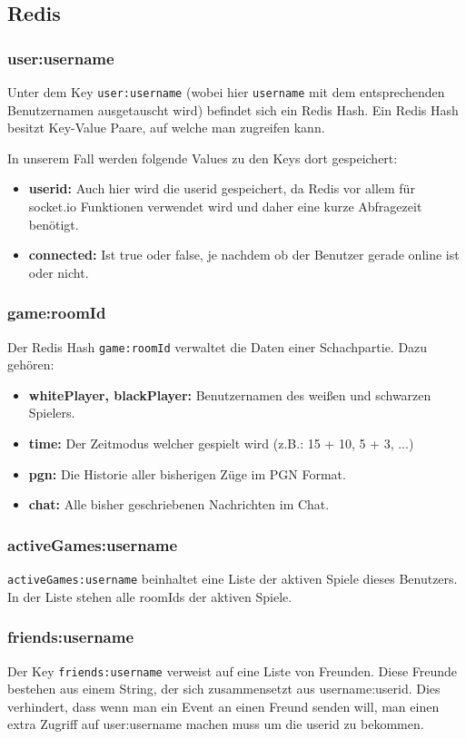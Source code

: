\subsection{Redis}
\label{sec:redis-data}
\subsubsection{user:username}
Unter dem Key \verb|user:username| (wobei hier \verb|username| mit dem entsprechenden Benutzernamen ausgetauscht wird) befindet sich ein Redis Hash. Ein Redis Hash besitzt Key-Value Paare, auf welche man zugreifen kann.

In unserem Fall werden folgende Values zu den Keys dort gespeichert:
\begin{itemize}
\item \textbf{userid:} Auch hier wird die userid gespeichert, da Redis vor allem für socket.io Funktionen verwendet wird und daher eine kurze Abfragezeit benötigt.
\item \textbf{connected:} Ist \glqq true\grqq{ } oder \glqq false\grqq , je nachdem ob der Benutzer gerade online ist oder nicht.
\end{itemize}

\subsubsection{game:roomId}
Der Redis Hash \verb|game:roomId| verwaltet die Daten einer Schachpartie. Dazu gehören:
\begin{itemize}
\item \textbf{whitePlayer, blackPlayer:} Benutzernamen des weißen und schwarzen Spielers.
\item \textbf{time:} Der Zeitmodus welcher gespielt wird (z.B.: 15 + 10, 5 + 3, ...)
\item \textbf{pgn:} Die Historie aller bisherigen Züge im PGN Format.
\item \textbf{chat:} Alle bisher geschriebenen Nachrichten im Chat.
\end{itemize}

\subsubsection{activeGames:username}
\verb|activeGames:username| beinhaltet eine Liste der aktiven Spiele dieses Benutzers. In der Liste stehen alle roomIds der aktiven Spiele.

\subsubsection{friends:username}
Der Key \verb|friends:username| verweist auf eine Liste von Freunden. Diese Freunde bestehen aus einem String, der sich zusammensetzt aus username:userid. Dies verhindert, dass wenn man ein Event an einen Freund senden will, man einen extra Zugriff auf user:username machen muss um die userid zu bekommen.

